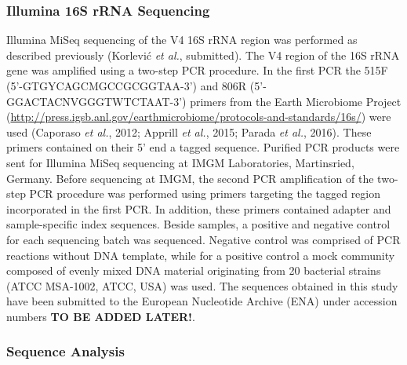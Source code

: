 \documentclass[12pt,]{article}
\begin{document}
\hypertarget{illumina-16s-rrna-sequencing}{%
\subsubsection{Illumina 16S rRNA
Sequencing}\label{illumina-16s-rrna-sequencing}}

Illumina MiSeq sequencing of the V4 16S rRNA region was performed as
described previously (Korlević \emph{et al.}, submitted). The V4 region
of the 16S rRNA gene was amplified using a two-step PCR procedure. In
the first PCR the 515F (5'-GTGYCAGCMGCCGCGGTAA-3') and 806R
(5'-GGACTACNVGGGTWTCTAAT-3') primers from the Earth Microbiome Project
(\url{http://press.igsb.anl.gov/earthmicrobiome/protocols-and-standards/16s/})
were used (Caporaso \emph{et al.}, 2012; Apprill \emph{et al.}, 2015;
Parada \emph{et al.}, 2016). These primers contained on their 5' end a
tagged sequence. Purified PCR products were sent for Illumina MiSeq
sequencing at IMGM Laboratories, Martinsried, Germany. Before sequencing
at IMGM, the second PCR amplification of the two-step PCR procedure was
performed using primers targeting the tagged region incorporated in the
first PCR. In addition, these primers contained adapter and
sample-specific index sequences. Beside samples, a positive and negative
control for each sequencing batch was sequenced. Negative control was
comprised of PCR reactions without DNA template, while for a positive
control a mock community composed of evenly mixed DNA material
originating from 20 bacterial strains (ATCC MSA-1002, ATCC, USA) was
used. The sequences obtained in this study have been submitted to the
European Nucleotide Archive (ENA) under accession numbers \textbf{TO BE
ADDED LATER!}.

\hypertarget{sequence-analysis}{%
\subsubsection{Sequence Analysis}\label{sequence-analysis}}
\end{document}
